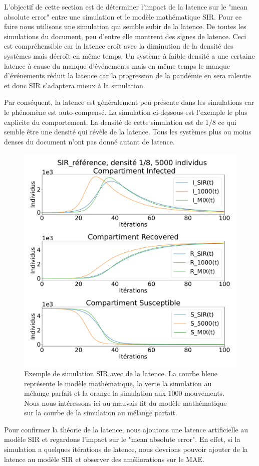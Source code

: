 L'objectif de cette section est de déterminer l'impact de la latence sur le "mean absolute error" entre une simulation et le modèle mathématique SIR. Pour ce faire nous utilisons une simulation qui semble subir de la latence. De toutes les simulations du document, peu d'entre elle montrent des signes de latence. Ceci est compréhensible car la latence croît avec la diminution de la densité des systèmes mais décroît en même temps. Un système à faible densité a une certaine latence à cause du manque d'événements mais en même temps le manque d'événements réduit la latence car la progression de la pandémie en sera ralentie et donc SIR s'adaptera mieux à la simulation.\\

\newpage

Par conséquent, la latence est généralement peu présente dans les simulations car le phénomène est auto-compensé. La simulation ci-dessous est l'exemple le plus explicite du comportement. La densité de cette simulation est de $1/8$ ce qui semble être une densité qui révèle de la latence. Tous les systèmes plus ou moins denses du document n'ont pas donné autant de latence.

\begin{figure}[h]
	\centering
	\captionsetup{justification=centering}
	\includegraphics[width=.6\textwidth]{Images/SIR_ref_8_5.pdf}
	\caption[Simulation SIR avec latence]{Exemple de simulation SIR avec de la latence. La courbe bleue représente le modèle mathématique, la verte la simulation au mélange parfait et la orange la simulation aux $1000$ mouvements. Nous nous intéressons ici au mauvais fit du modèle mathématique sur la courbe de la simulation au mélange parfait.}
\end{figure}

Pour confirmer la théorie de la latence, nous ajoutons une latence artificielle au modèle SIR et regardons l'impact sur le "mean absolute error". En effet, si la simulation a quelques itérations de latence, nous devrions pouvoir ajouter de la latence au modèle SIR et observer des améliorations sur le MAE.

